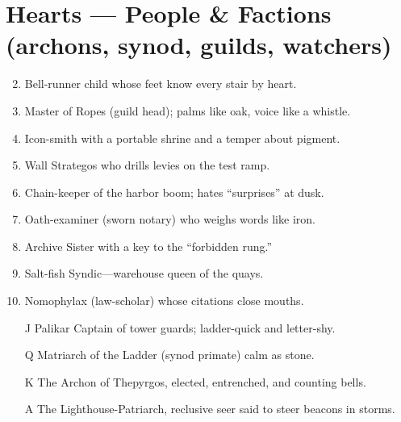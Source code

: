 \section*{Hearts --- People \& Factions (archons, synod, guilds, watchers)}
\begin{enumerate}
\setcounter{enumi}{1}
\item Bell-runner child whose feet know every stair by heart.
\item Master of Ropes (guild head); palms like oak, voice like a whistle.
\item Icon-smith with a portable shrine and a temper about pigment.
\item Wall Strategos who drills levies on the test ramp.
\item Chain-keeper of the harbor boom; hates ``surprises'' at dusk.
\item Oath-examiner (sworn notary) who weighs words like iron.
\item Archive Sister with a key to the ``forbidden rung.''
\item Salt-fish Syndic---warehouse queen of the quays.
\item Nomophylax (law-scholar) whose citations close mouths.
\item[J] Palikar Captain of tower guards; ladder-quick and letter-shy.
\item[Q] Matriarch of the Ladder (synod primate) calm as stone.
\item[K] The Archon of Thepyrgos, elected, entrenched, and counting bells.
\item[A] The Lighthouse-Patriarch, reclusive seer said to steer beacons in storms.
\end{enumerate}

